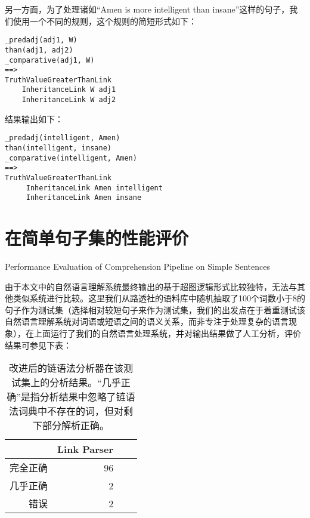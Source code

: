 另一方面，为了处理诸如“Amen is more intelligent than insane”这样的句子，我们使用一个不同的规则，这个规则的简短形式如下：

{\tt\begin{small}\begin{lstlisting}
_predadj(adj1, W)
than(adj1, adj2)
_comparative(adj1, W)
==>
TruthValueGreaterThanLink
    InheritanceLink W adj1
    InheritanceLink W adj2
 \end{lstlisting}\end{small}}
 
结果输出如下：

 {\tt\begin{small}\begin{lstlisting}
_predadj(intelligent, Amen)
than(intelligent, insane)
_comparative(intelligent, Amen)
==>
TruthValueGreaterThanLink
     InheritanceLink Amen intelligent
     InheritanceLink Amen insane
 \end{lstlisting}\end{small}}

\section{在简单句子集的性能评价}{Performance Evaluation of Comprehension Pipeline on Simple Sentences}


由于本文中的自然语言理解系统最终输出的基于超图逻辑形式比较独特，无法与其他类似系统进行比较。这里我们从路透社的语料库中随机抽取了100个词数小于8的句子作为测试集（选择相对较短句子来作为测试集，我们的出发点在于着重测试该自然语言理解系统对词语或短语之间的语义关系，而非专注于处理复杂的语言现象），在上面运行了我们的自然语言处理系统，并对输出结果做了人工分析，评价结果可参见下表：


\FloatBarrier

\begin{table}
\center
\begin{tabular}{|r|r|r||c|}
\hline
 & Link Parser\\
\hline
完全正确 & 96   \\
几乎正确 & 2    \\
错误 & 2       \\

\hline
\end{tabular}
\caption{改进后的链语法分析器在该测试集上的分析结果。“几乎正确”是指分析结果中忽略了链语法词典中不存在的词，但对剩下部分解析正确。}
\label{table:linkparseResult}
\end{table}


